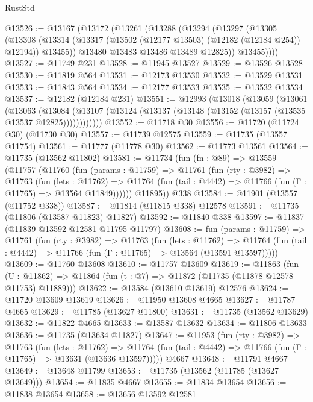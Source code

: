 \begin{lexlean}{RustStd}
\begin{coremodule}
{\begin{coremodule}
{{{{{{{{{{{{{{{{{{{{{{{{{{{{{{{{{{{{{{{{{{{{{{{{{{{{{{{{{{{{{{{{{{{{@13526 := @13167
    (@13172
      (@13261
        (@13288
          (@13294
            (@13297
              (@13305
                (@13308
                  (@13314 (@13317 (@13502 (@12177 @13503) (@12182 (@12184 @254)) @12194)) @13455))
                @13480
                @13483
                @13486
                @13489
                @12825))
            @13455))))
@13527 := @11749 @231
@13528 := @11945 @13527
@13529 := @13526 @13528
@13530 := @11819 @564
@13531 := @12173 @13530
@13532 := @13529 @13531
@13533 := @11843 @564
@13534 := @12177 @13533
@13535 := @13532 @13534
@13537 := @12182 (@12184 @231)
@13551 := @12993
    (@13018
      (@13059
        (@13061
          (@13063
            (@13084
              (@13107 (@13124 (@13137 (@13148 (@13152 (@13157 (@13535 @13537 @12825))))))))))))
@13552 := @11718 @30
@13556 := @11720 (@11724 @30) (@11730 @30)
@13557 := @11739 @12575
@13559 := @11735 (@13557 @11754)
@13561 := @11777 (@11778 @30)
@13562 := @11773 @13561
@13564 := @11735 (@13562 @11802)
@13581 := @11734
    (fun (fn : @89) =>
    @13559
      (@11757
        (@11760
          (fun (params : @11759) =>
          @11761
            (fun (rty : @3982) =>
            @11763
              (fun (lets : @11762) =>
              @11764 (fun (tail : @4442) => @11766 (fun (Γ : @11765) => @13564 @11849))))))
        @11895))
    @338
@13584 := @11901 (@13557 (@11752 @338))
@13587 := @11814 (@11815 @338) @12578
@13591 := @11735 (@11806 (@13587 @11823) @11827)
@13592 := @11840 @338
@13597 := @11837 (@11839 @13592 @12581 @11795 @11797)
@13608 := fun (params : @11759) =>
  @11761
    (fun (rty : @3982) =>
    @11763
      (fun (lets : @11762) =>
      @11764 (fun (tail : @4442) => @11766 (fun (Γ : @11765) => @13564 (@13591 @13597)))))
@13609 := @11760 @13608
@13610 := @11757 @13609
@13619 := @11863
    (fun (U : @11862) => @11864 (fun (t : @7) => @11872 (@11735 (@11878 @12578 @11753) @11889)))
@13622 := @13584 (@13610 @13619) @12576
@13624 := @11720 @13609 @13619
@13626 := @11950 @13608 @4665
@13627 := @11787 @4665
@13629 := @11785 (@13627 @11800)
@13631 := @11735 (@13562 @13629)
@13632 := @11822 @4665
@13633 := @13587 @13632
@13634 := @11806 @13633
@13636 := @11735 (@13634 @11827)
@13647 := @11953
    (fun (rty : @3982) =>
    @11763
      (fun (lets : @11762) =>
      @11764 (fun (tail : @4442) => @11766 (fun (Γ : @11765) => @13631 (@13636 @13597)))))
    @4667
@13648 := @11791 @4667
@13649 := @13648 @11799
@13653 := @11735 (@13562 (@11785 (@13627 @13649)))
@13654 := @11835 @4667
@13655 := @11834 @13654
@13656 := @11838 @13654
@13658 := @13656 @13592 @12581
}}}}}}}}}}}}}}}}}}}}}}}}}}}}}}}}}}}}}}}}}}}}}}}}}}}}}}}}}}}}}}}}}}}}
\end{coremodule}}
\end{coremodule}
\end{lexlean}
